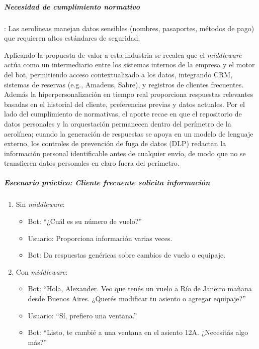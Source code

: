 \subparagraph{Necesidad de cumplimiento normativo}: Las aerolíneas manejan datos sensibles (nombres, pasaportes, métodos de pago) que requieren altos estándares de seguridad.

Aplicando la propuesta de valor a esta industria se recalca que el \textit{middleware} actúa como un intermediario entre los sistemas internos de la empresa y el motor del bot, permitiendo acceso contextualizado a los datos, integrando CRM, sistemas de reservas (e.g., Amadeus, Sabre), y registros de clientes frecuentes. Además la hiperpersonalización en tiempo real proporciona respuestas relevantes basadas en el historial del cliente, preferencias previas y datos actuales. Por el lado del cumplimiento de normativas, el aporte recae en que el repositorio de datos personales y la orquestación permanecen dentro del perímetro de la aerolínea; cuando la generación de respuestas se apoya en un modelo de lenguaje externo, los controles de prevención de fuga de datos (DLP) redactan la información personal identificable antes de cualquier envío, de modo que no se transfieren datos personales en claro fuera del perímetro.

\subparagraph{Escenario práctico: Cliente frecuente solicita información}

\begin{enumerate}
    \item Sin \textit{middleware}:
    \begin{itemize}
        \item Bot: ``¿Cuál es su número de vuelo?''
        \item Usuario: Proporciona información varias veces.
        \item Bot: Da respuestas genéricas sobre cambios de vuelo o equipaje.
    \end{itemize}
    
    \item Con \textit{middleware}:
    \begin{itemize}
        \item Bot: ``Hola, Alexander. Veo que tenés un vuelo a Río de Janeiro mañana desde Buenos Aires. ¿Querés modificar tu asiento o agregar equipaje?''
        \item Usuario: ``Sí, prefiero una ventana.''
        \item Bot: ``Listo, te cambié a una ventana en el asiento 12A. ¿Necesitás algo más?''
    \end{itemize}
\end{enumerate}

